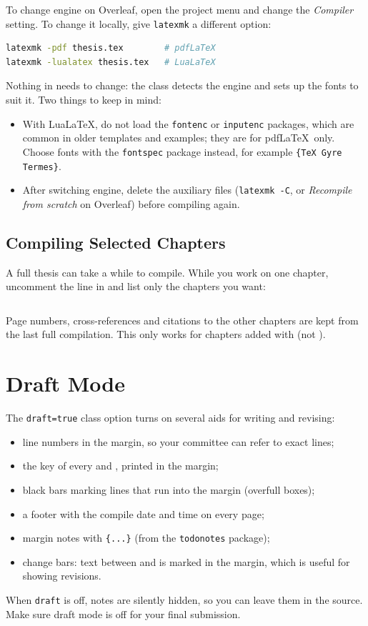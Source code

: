 To change engine on Overleaf, open the project menu and change the \emph{Compiler} setting. To change it locally, give \texttt{latexmk} a different option:
\begin{lstlisting}[language=bash]
latexmk -pdf thesis.tex        # pdfLaTeX
latexmk -lualatex thesis.tex   # LuaLaTeX
\end{lstlisting}
Nothing in  needs to change: the class detects the engine and sets up the fonts to suit it. Two things to keep in mind:
\begin{itemize}
    \item With Lua\LaTeX, do not load the \texttt{fontenc} or \texttt{inputenc} packages, which are common in older templates and examples; they are for pdf\LaTeX\ only. Choose fonts with the \texttt{fontspec} package instead, for example \texttt{\{TeX Gyre Termes\}}.
    \item After switching engine, delete the auxiliary files (\texttt{latexmk -C}, or \emph{Recompile from scratch} on Overleaf) before compiling again.
\end{itemize}

\subsection{Compiling Selected Chapters}

A full thesis can take a while to compile. While you work on one chapter, uncomment the  line in  and list only the chapters you want:
\begin{lstlisting}[language=TeX]

\end{lstlisting}
Page numbers, cross-references and citations to the other chapters are kept from the last full compilation. This only works for chapters added with  (not ).

\section{Draft Mode}
\label{sec:draft-mode}

The \texttt{draft=true} class option turns on several aids for writing and revising:
\begin{itemize}
    \item line numbers in the margin, so your committee can refer to exact lines;
    \item the key of every  and , printed in the margin;
    \item black bars marking lines that run into the margin (overfull boxes);
    \item a footer with the compile date and time on every page;
    \item margin notes with \texttt{\{...\}} (from the \texttt{todonotes} package);
    \item change bars: text between  and  is marked in the margin, which is useful for showing revisions.
\end{itemize}
When \texttt{draft} is off,  notes are silently hidden, so you can leave them in the source. Make sure draft mode is off for your final submission.

